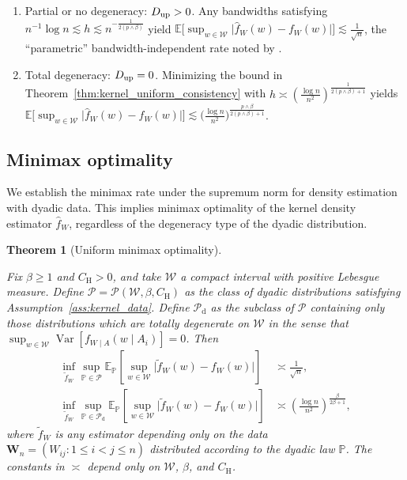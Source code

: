 \documentclass[11pt,lof]{puthesis}
\renewcommand{\P}{\ensuremath{\mathbb{P}}}
\newcommand{\E}{\ensuremath{\mathbb{E}}}
\newcommand{\rH}{\ensuremath{\mathrm{H}}}
\newcommand{\rd}{\ensuremath{\mathrm{d}}}
\newcommand{\bW}{\ensuremath{\mathbf{W}}}
\newcommand{\cW}{\ensuremath{\mathcal{W}}}
\newcommand{\cP}{\ensuremath{\mathcal{P}}}
\newcommand{\Du}{\ensuremath{D_{\textup{up}}}}
\DeclareMathOperator{\Var}{Var}
\theoremstyle{break}
\newtheorem{theorem}{Theorem}[section]
\theoremstyle{proof}
\begin{document}
%
\begin{enumerate}[label=(\roman*)]
\item Partial or no degeneracy: $\Du > 0$.
Any bandwidths satisfying
$n^{-1} \log n \lesssim h \lesssim n^{-\frac{1}{2(p\wedge\beta)}}$ yield
$\E\big[\sup_{w \in \cW}\big|\hat f_W(w)
- f_W(w)\big| \big] \lesssim \frac{1}{\sqrt n}$, the ``parametric''
bandwidth-independent rate noted by \citet{graham2024kernel}.

\item Total degeneracy: $\Du = 0$.
Minimizing the bound in Theorem~\ref{thm:kernel_uniform_consistency} with
$h \asymp \left( \frac{\log n}{n^2} \right)^{\frac{1}{2(p\wedge\beta)+1}}$
yields $\E\big[ \sup_{w \in \cW} \big|\hat f_W(w) - f_W(w)\big| \big]
\lesssim
\big(\frac{\log n}{n^2} \big)^{\frac{p\wedge\beta}{2(p\wedge\beta)+1}}$.
\end{enumerate}

\subsection{Minimax optimality}

We establish the minimax rate under the supremum norm for density estimation
with dyadic data. This implies minimax optimality of the kernel density
estimator $\hat f_W$, regardless of the degeneracy type of the dyadic
distribution.

\begin{theorem}[Uniform minimax optimality]
\label{thm:kernel_minimax}

Fix $\beta \geq 1$ and $C_\rH > 0$, and take $\cW$ a compact interval with
positive Lebesgue measure. Define $\cP = \cP(\cW, \beta, C_\rH)$ as the class
of dyadic distributions satisfying Assumption~\ref{ass:kernel_data}. Define
$\cP_\rd$ as the subclass of $\cP$ containing only those distributions which
are totally degenerate on $\cW$ in the sense that
$\sup_{w \in \cW} \Var\left[f_{W \mid A}(w \mid A_i)\right] = 0$. Then
%
\begin{align*}
\inf_{\tilde f_W}
\sup_{\P \in \cP}
\E_\P\left[
\sup_{w \in \cW}
\big| \tilde f_W(w) - f_W(w) \big|
\right]
&\asymp
\frac{1}{\sqrt n}, \\
\inf_{\tilde f_W}
\sup_{\P \in \cP_\rd}
\E_\P\left[
\sup_{w \in \cW}
\big| \tilde f_W(w) - f_W(w) \big|
\right]
&\asymp
\left( \frac{\log n}{n^2} \right)^{\frac{\beta}{2\beta+1}},
\end{align*}
%
where $\tilde f_W$ is any estimator depending only on the data
$\bW_n = (W_{i j}: 1 \leq i < j \leq n)$ distributed according to the dyadic
law $\P$. The constants in $\asymp$ depend only on
$\cW$, $\beta$, and $C_\rH$.

\end{theorem}
\end{document}
